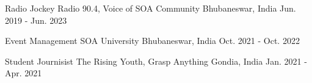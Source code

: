 

\begin{cventries}

  \cvecaentry
    {Radio Jockey} %
    {Radio 90.4, Voice of SOA Community} %
    {Bhubaneswar, India} %
    {Jun. 2019 - Jun. 2023} %

  \cvecaentry
    {Event Management} %
    {SOA University} %
    {Bhubaneswar, India} %
    {Oct. 2021 - Oct. 2022} %

  \cvecaentry
    {Student Journisist} %
    {The Rising Youth, Grasp Anything} %
    {Gondia, India} %
    {Jan. 2021 - Apr. 2021} %

\end{cventries}
